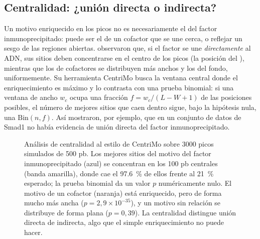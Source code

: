 \subsection{Centralidad: ¿unión directa o indirecta?}

Un motivo enriquecido en los picos no es necesariamente el del factor inmunoprecipitado: puede ser el de un cofactor que se une cerca, o reflejar un sesgo de las regiones abiertas. \textcite{c13-bailey2012} observaron que, si el factor se une \emph{directamente} al ADN, sus sitios deben concentrarse en el centro de los picos (la posición del ), mientras que los de cofactores se distribuyen más anchos y los del fondo, uniformemente. Su herramienta CentriMo busca la ventana central donde el enriquecimiento es máximo y lo contrasta con una prueba binomial: si una ventana de ancho $w_c$ ocupa una fracción $f=w_c/(L-W+1)$ de las posiciones posibles, el número de mejores sitios que caen dentro sigue, bajo la hipótesis nula, una $\mathrm{Bin}(n,f)$. Así mostraron, por ejemplo, que en un conjunto de datos de Smad1 no había evidencia de unión directa del factor inmunoprecipitado.

\begin{figure}[t]
\centering
{}
\caption[Análisis de centralidad]{Análisis de centralidad al estilo de CentriMo sobre \num{3000} picos simulados de 500 pb. Los mejores sitios del motivo del factor inmunoprecipitado (azul) se concentran en los 100 pb centrales (banda amarilla), donde cae el \SI{97,6}{\percent} de ellos frente al \SI{21}{\percent} esperado; la prueba binomial da un valor $p$ numéricamente nulo. El motivo de un cofactor (naranja) está enriquecido, pero de forma mucho más ancha ($p=2{,}9\times10^{-35}$), y un motivo sin relación se distribuye de forma plana ($p=0{,}39$). La centralidad distingue unión directa de indirecta, algo que el simple enriquecimiento no puede hacer.}
\label{fig:13-centrimo}
\end{figure}


